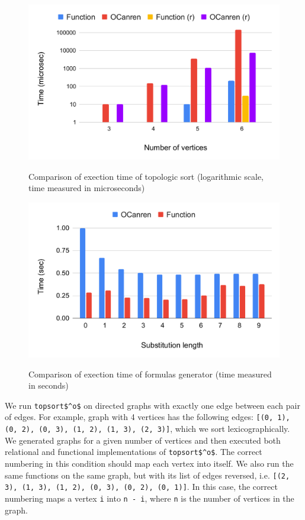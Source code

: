 \begin{figure}[!h]
\caption{Comparison of exection time of topologic sort (logarithmic scale, time measured in microseconds)}
\includegraphics[width=\columnwidth]{fig/eval/topsort.pdf}
\label{graph:topsort}
\end{figure}


\begin{figure}[!h]
\caption{Comparison of exection time of formulas generator (time measured in seconds)}
\includegraphics[width=\columnwidth]{fig/eval/prop.pdf}
\label{graph:prop}
\end{figure}




We run \lstinline{topsort$^o$} on directed graphs with exactly one edge between each pair of edges.
For example, graph with 4 vertices has the following edges: \lstinline[breaklines=true]{[(0, 1), (0, 2), (0, 3), (1, 2), (1, 3), (2, 3)]}, which we sort lexicographically.
We generated graphs for a given number of vertices and then executed both relational and functional implementations of \lstinline{topsort$^o$}.
The correct numbering in this condition should map each vertex into itself.
We also run the same functions on the same graph, but with its list of edges reversed, i.e. \lstinline[breaklines=true]{[(2, 3), (1, 3), (1, 2), (0, 3), (0, 2), (0, 1)]}.
In this case, the correct numbering maps a vertex \lstinline{i} into \lstinline{n - i}, where \lstinline{n} is the number of vertices in the graph.

